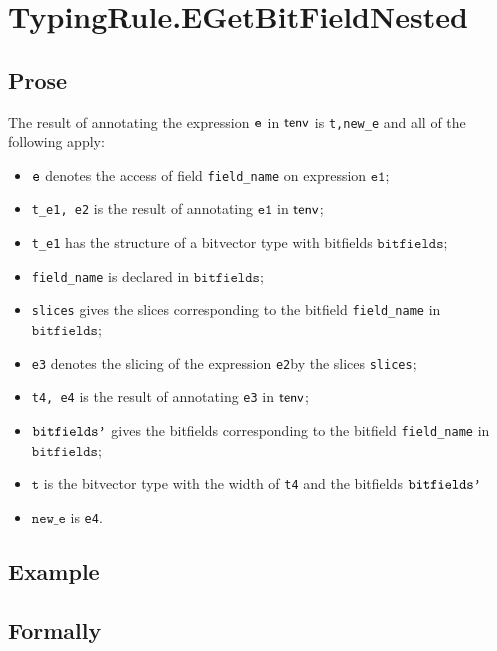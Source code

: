 \documentclass{book}
\newcommand\vt[0]{\texttt{t}}
\newcommand\veone[0]{\texttt{e1}}
\newcommand\vetwo[0]{\texttt{e2}}
\newcommand\bitfields[0]{\texttt{bitfields}}
\newcommand\newe[0]{\texttt{new\_e}}
\begin{document}

\section{TypingRule.EGetBitFieldNested \label{sec:TypingRule.EGetBitFieldNested}}

  \subsection{Prose}
  The result of annotating the expression $\texttt{e}$ in $\textsf{tenv}$ is
\texttt{t,new\_e} and all of the following apply:
  \begin{itemize}
  \item $\texttt{e}$ denotes the access of field \texttt{field\_name} on expression $\veone$;
  \item \texttt{t\_e1, e2} is the result of annotating $\veone$ in $\textsf{tenv}$;
  \item \texttt{t\_e1} has the structure of a bitvector type with bitfields $\bitfields$;
  \item \texttt{field\_name} is declared in $\bitfields$;
  \item \texttt{slices} gives the slices corresponding to the bitfield \texttt{field\_name} in \\
    $\bitfields$;
  \item \texttt{e3} denotes the slicing of the expression \vetwo by the slices \texttt{slices};
  \item \texttt{t4, e4} is the result of annotating \texttt{e3} in $\textsf{tenv}$;
  \item $\texttt{bitfields'}$ gives the bitfields corresponding to the bitfield \texttt{field\_name}
    in $\bitfields$;
  \item $\vt$ is the bitvector type with the width of \texttt{t4} and the bitfields $\texttt{bitfields'}$
  \item $\newe$ is \texttt{e4}.
  \end{itemize}

  \subsection{Example}



\begin{emptyformal}
    \subsection{Formally}
\end{emptyformal}
\end{document}
